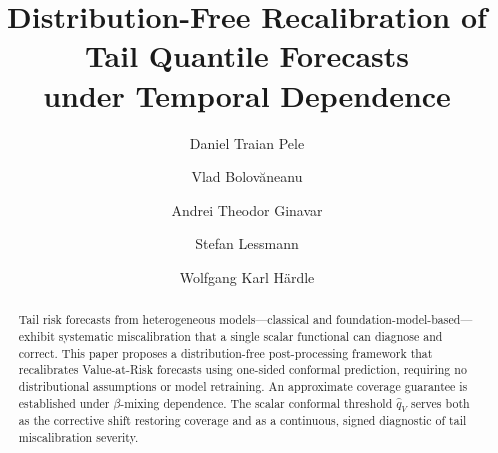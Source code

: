 \documentclass[preprint,11pt,authoryear]{elsarticle}
\newcommand{\1}{\boldsymbol{1}}
\begin{document}
	
	\begin{frontmatter}
		
		\title{Distribution-Free Recalibration of Tail Quantile Forecasts\\
			under Temporal Dependence}
		
		\author[1,2,3]{Daniel Traian Pele}
		
		\author[1]{Vlad Bolov\u{a}neanu}
		
		\author[1]{Andrei Theodor Ginavar}
		
		
		\author[1,4]{Stefan Lessmann}
		
		\author[1,3,4,5,6]{Wolfgang Karl H{\"a}rdle}
		
		
		
		
		
		
		\begin{abstract}
			Tail risk forecasts from heterogeneous models---classical and
			foundation-model-based---exhibit systematic miscalibration that a
			single scalar functional can diagnose and correct. This paper
			proposes a distribution-free post-processing framework that
			recalibrates Value-at-Risk forecasts using one-sided conformal
			prediction, requiring no distributional assumptions or model
			retraining. An approximate coverage guarantee is established under
			$\beta$-mixing dependence. The scalar conformal threshold
			$\hat{q}_V$ serves both as the corrective shift restoring coverage
			and as a continuous, signed diagnostic of tail miscalibration
			severity.
			

\end{abstract}
\end{frontmatter}
\end{document}

